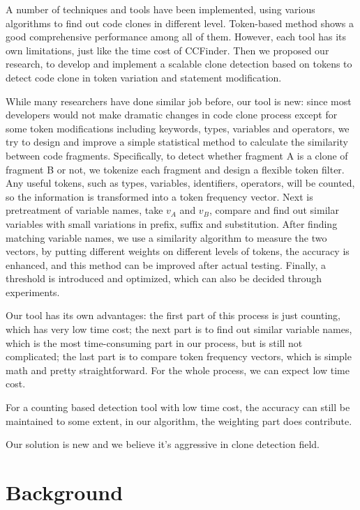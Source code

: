 \documentclass[conference]{IEEEtran}
\begin{document}
A number of techniques and tools have been implemented, using various algorithms to find out code clones in different level. Token-based method shows a good comprehensive performance among all of them. However, each tool has its own limitations, just like the time cost of CCFinder. Then we proposed our research, to develop and implement a scalable clone detection based on tokens to detect code clone in token variation and statement modification.

While many researchers have done similar job before, our tool is new: since most developers would not make dramatic changes in code clone process except for some token modifications including keywords, types, variables and operators, we try to design and improve a simple statistical method to calculate the similarity between code fragments. Specifically, to detect whether fragment A is a clone of fragment B or not, we tokenize each fragment and design a flexible token filter. Any useful tokens, such as types, variables, identifiers, operators, will be counted, so the information is transformed into a token frequency vector. Next is pretreatment of variable names, take $v_A$ and $v_B$, compare and find out similar variables with small variations in prefix, suffix and substitution. After finding matching variable names, we use a similarity algorithm to measure the two vectors, by putting different weights on different levels of tokens, the accuracy is enhanced, and this method can be improved after actual testing. Finally, a threshold is introduced and optimized, which can also be decided through experiments.

Our tool has its own advantages: the first part of this process is just counting, which has very low time cost; the next part is to find out similar variable names, which is the most time-consuming part in our process, but is still not complicated; the last part is to compare token frequency vectors, which is simple math and pretty straightforward. For the whole process, we can expect low time cost.

For a counting based detection tool with low time cost, the accuracy can still be maintained to some extent, in our algorithm, the weighting part does contribute.

Our solution is new and we believe it's aggressive in clone detection field.

\section{Background}
\end{document}
